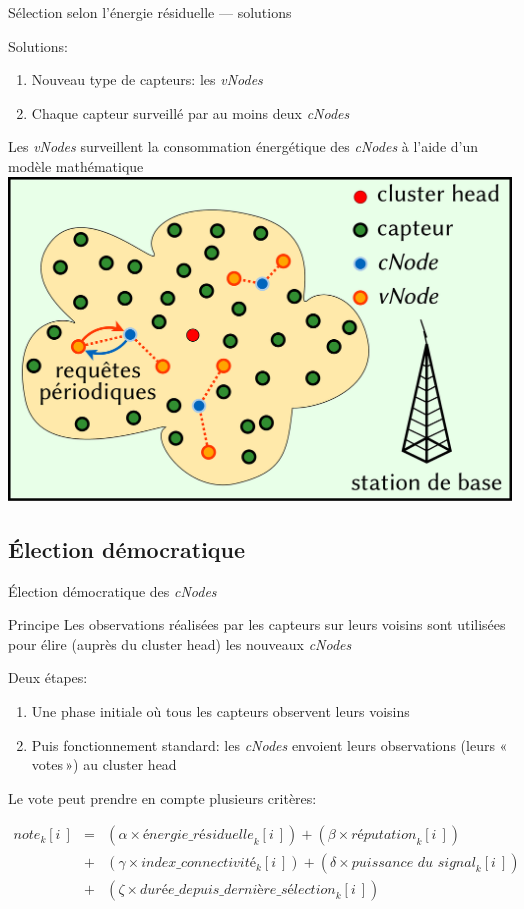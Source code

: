 \documentclass[aspectratio=43]{beamer} %
\newcommand\ch{cluster head\xspace}
\newcommand\cns{\textit{cNodes}\xspace}
\newcommand\vns{\textit{vNodes}\xspace}
\begin{document}
\begin{frame}{Sélection selon l'énergie résiduelle --- solutions}
  \begin{block}{Solutions:}
    \begin{enumerate}
      \item Nouveau type de capteurs: les \vns
      \item Chaque capteur surveillé par au moins deux \cns
    \end{enumerate}
  \end{block}
  Les \vns surveillent la consommation énergétique des \cns à l'aide d'un modèle mathématique
  \vfill
  \centering
  \includegraphics[width=.6\textwidth]{Figs/WSN_vNodes.pdf}
\end{frame}
\subsection{Élection démocratique}
\begin{frame}{Élection démocratique des \cns}
  \begin{block}{Principe}
    Les observations réalisées par les capteurs sur leurs voisins sont utilisées pour élire (auprès du \ch) les nouveaux \cns
  \end{block}
  Deux étapes:
  \begin{enumerate}
    \item Une phase initiale où tous les capteurs observent leurs voisins
    \item Puis fonctionnement standard: les \cns envoient leurs observations (leurs «\,votes\,») au \ch
  \end{enumerate}
  \bigskip
  Le vote peut prendre en compte plusieurs critères:
  \begin{footnotesize}
    \begin{eqnarray*}
      \textit{note}_k[i\:\!] & = & (\alpha \times \textit{énergie\_résiduelle}_k[i\:\!]) + (\beta \times \textit{réputation}_k[i\:\!])\\
                             & + & (\gamma \times \textit{index\_connectivité}_k[i\:\!]) + (\delta \times \textit{puissance du signal}_k[i\:\!])\\
                             & + & (\zeta  \times \textit{durée\_depuis\_dernière\_sélection}_k[i\:\!])
    \end{eqnarray*}
  \end{footnotesize}
\end{frame}
\end{document}
